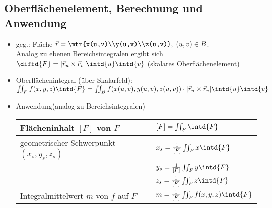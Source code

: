 \subsection{Oberflächenelement, Berechnung und Anwendung}
\begin{itemize}
\item geg.: Fläche $\vec{r}=\mtr{x(u,v)\\y(u,v)\\z(u,v)}, \; (u,v) \in B$.\\
Analog zu ebenen Bereichsintegralen ergibt sich $\diffd{F}=|\vec{r}_u\times \vec{r}_v| \intd{u}\intd{v}$ (skalares Oberflächenelement)
\item Oberflächenintegral (über Skalarfeld):\\
$\iint_F f(x,y,z)\intd{F}=\iint_B f(x(u,v),y(u,v),z(u,v))\cdot |\vec{r}_u\times \vec{r}_v| \intd{u}\intd{v}$
\item Anwendung(analog zu Bereichsintegralen)\\
\begin{tabular}{L{0.5} | L{0.4}}
Flächeninhalt $[F]$ von $F$ & $[F]=\iint_F \intd{F}$\\
\hline
geometrischer Schwerpunkt $(x_s,y_s,z_s)$ & $x_s = \frac{1}{[F]}\iint_F x \intd{F}$\\&$y_s = \frac{1}{[F]}\iint_F y \intd{F}$\\&$z_s=\frac{1}{[F]}\iint_F z \intd{F}$\\
\hline
Integralmittelwert $m$ von $f$ auf $F$ & $m=\frac{1}{[F]}\iint_F f(x,y,z) \intd{F}$
\end{tabular}
\end{itemize}

